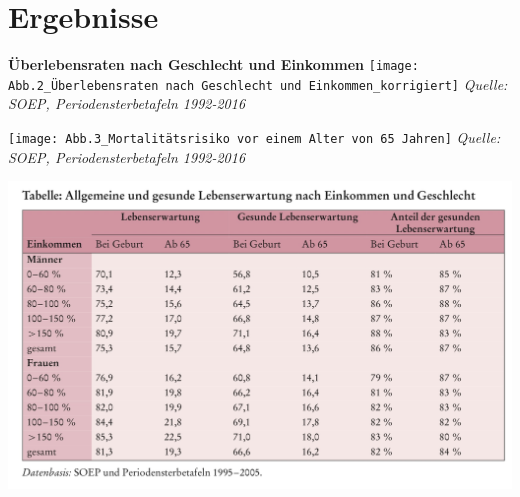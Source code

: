 \documentclass{beamer}
\begin{document}
\section{Ergebnisse}
\begin{frame}
\textbf{Überlebensraten nach Geschlecht und Einkommen}
	\texttt{[image: Abb.2\_Überlebensraten nach Geschlecht und Einkommen\_korrigiert]}
	\emph{Quelle: SOEP, Periodensterbetafeln 1992-2016}
\end{frame}

\begin{frame}
	\texttt{[image: Abb.3\_Mortalitätsrisiko vor einem Alter von 65 Jahren]}
	\emph{Quelle: SOEP, Periodensterbetafeln 1992-2016}
\end{frame}

\begin{frame}
	\includegraphics[scale=0.18]{Tabelle_allgemeine und gesunde Lebenserwartung}
\end{frame}
 
 
\end{document}
